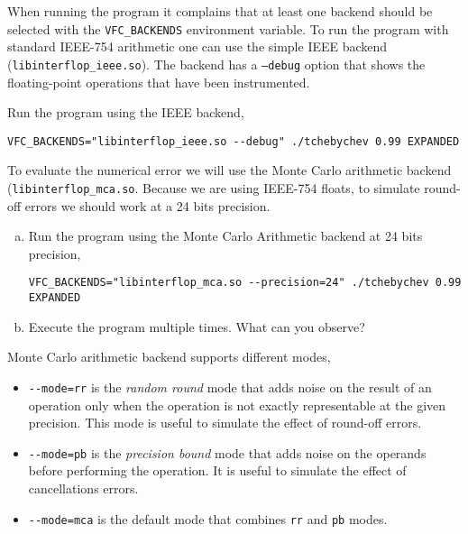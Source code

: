 When running the program it complains that at least one backend should be
selected with the \texttt{VFC\_BACKENDS} environment variable.
To run the program with standard IEEE-754 arithmetic one can use the simple
IEEE backend (\texttt{libinterflop\_ieee.so}). The backend has a \texttt{--debug}
option that shows the floating-point operations that have been instrumented.

\begin{question}
Run the program using the IEEE backend,
\begin{verbatim}
VFC_BACKENDS="libinterflop_ieee.so --debug" ./tchebychev 0.99 EXPANDED
\end{verbatim}
\end{question}

To evaluate the numerical error we will use the Monte Carlo arithmetic backend
(\texttt{libinterflop\_mca.so}.  Because we are using IEEE-754 floats, to
simulate round-off errors we should work at a 24 bits precision.

\begin{question}
  \begin{enumerate}[(a)]
  \item Run the program using the Monte Carlo Arithmetic backend at 24 bits precision,
\begin{verbatim}
VFC_BACKENDS="libinterflop_mca.so --precision=24" ./tchebychev 0.99 EXPANDED
\end{verbatim}
  \item Execute the program multiple times. What can you observe?
  \end{enumerate}
\end{question}

Monte Carlo arithmetic backend supports different modes,
\begin{itemize}

  \item \texttt{-{}-mode=rr} is the \emph{random round} mode that adds noise on the
    result of an operation only when the operation is not exactly representable
    at the given precision. This mode is useful to simulate the effect of
    round-off errors.

  \item \texttt{-{}-mode=pb} is the \emph{precision bound} mode that adds noise on
  the operands before performing the operation. It is useful to simulate the
    effect of cancellations errors.

  \item \texttt{-{}-mode=mca} is the default mode that combines \texttt{rr} and
  \texttt{pb} modes.

\end{itemize}

